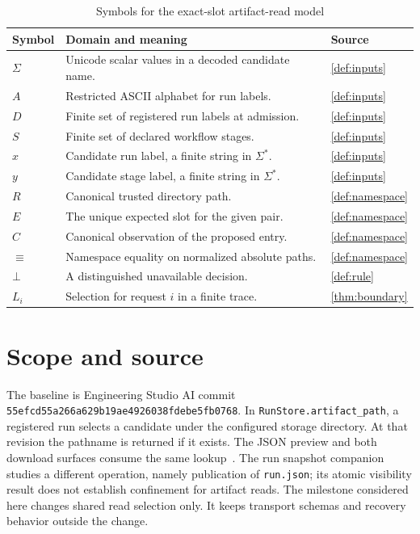 \documentclass[12pt]{article}
\newcommand{\denied}{\bot}
\begin{document}
\begin{table}[!htbp]
\centering\small
\caption{Symbols for the exact-slot artifact-read model}
\begin{tabularx}{\linewidth}{@{}lX l@{}}
\toprule
Symbol & Domain and meaning & Source \\
\midrule
$\Sigma$ & Unicode scalar values in a decoded candidate name. & \ref{def:inputs} \\
$A$ & Restricted ASCII alphabet for run labels. & \ref{def:inputs} \\
$D$ & Finite set of registered run labels at admission. & \ref{def:inputs} \\
$S$ & Finite set of declared workflow stages. & \ref{def:inputs} \\
$x$ & Candidate run label, a finite string in $\Sigma^*$. & \ref{def:inputs} \\
$y$ & Candidate stage label, a finite string in $\Sigma^*$. & \ref{def:inputs} \\
$R$ & Canonical trusted directory path. & \ref{def:namespace} \\
$E$ & The unique expected slot for the given pair. & \ref{def:namespace} \\
$C$ & Canonical observation of the proposed entry. & \ref{def:namespace} \\
$\equiv$ & Namespace equality on normalized absolute paths. & \ref{def:namespace} \\
$\denied$ & A distinguished unavailable decision. & \ref{def:rule} \\
$L_i$ & Selection for request $i$ in a finite trace. & \ref{thm:boundary} \\
\bottomrule
\end{tabularx}
\end{table}
\clearpage
\tableofcontents
\listoftables
\clearpage

\section{Scope and source}
The baseline is Engineering Studio AI commit
\nolinkurl{55efcd55a266a629b19ae4926038fdebe5fb0768}. In
\texttt{RunStore.artifact\_path}, a registered run selects a candidate
under the configured storage directory. At that revision the pathname
is returned if it exists. The JSON preview and both download surfaces
consume the same lookup~\cite{runtime}. The run snapshot companion~\cite{snapshot} studies a different
operation, namely publication of \texttt{run.json}; its atomic visibility
result does not establish confinement for artifact reads.
The milestone considered here changes shared read selection only. It
keeps transport schemas and recovery behavior outside the change.
\end{document}
